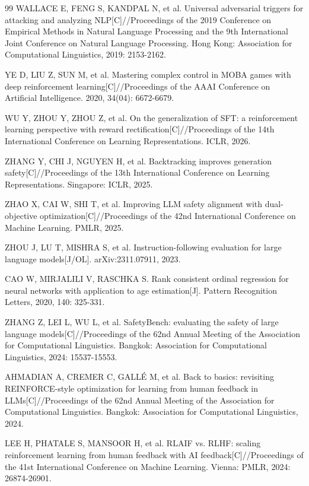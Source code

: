 \documentclass[fontset=fandol,type=master,campus=shenzhen,etitleauto=true]{hithesisbook}
\begin{document}
\begin{thebibliography}{99}
 WALLACE E, FENG S, KANDPAL N, et al. Universal adversarial triggers for attacking and analyzing NLP[C]//Proceedings of the 2019 Conference on Empirical Methods in Natural Language Processing and the 9th International Joint Conference on Natural Language Processing. Hong Kong: Association for Computational Linguistics, 2019: 2153-2162.

 YE D, LIU Z, SUN M, et al. Mastering complex control in MOBA games with deep reinforcement learning[C]//Proceedings of the AAAI Conference on Artificial Intelligence. 2020, 34(04): 6672-6679.

 WU Y, ZHOU Y, ZHOU Z, et al. On the generalization of SFT: a reinforcement learning perspective with reward rectification[C]//Proceedings of the 14th International Conference on Learning Representations. ICLR, 2026.

 ZHANG Y, CHI J, NGUYEN H, et al. Backtracking improves generation safety[C]//Proceedings of the 13th International Conference on Learning Representations. Singapore: ICLR, 2025.

 ZHAO X, CAI W, SHI T, et al. Improving LLM safety alignment with dual-objective optimization[C]//Proceedings of the 42nd International Conference on Machine Learning. PMLR, 2025.

 ZHOU J, LU T, MISHRA S, et al. Instruction-following evaluation for large language models[J/OL]. arXiv:2311.07911, 2023.

 CAO W, MIRJALILI V, RASCHKA S. Rank consistent ordinal regression for neural networks with application to age estimation[J]. Pattern Recognition Letters, 2020, 140: 325-331.

 ZHANG Z, LEI L, WU L, et al. SafetyBench: evaluating the safety of large language models[C]//Proceedings of the 62nd Annual Meeting of the Association for Computational Linguistics. Bangkok: Association for Computational Linguistics, 2024: 15537-15553.

 AHMADIAN A, CREMER C, GALL\'E M, et al. Back to basics: revisiting REINFORCE-style optimization for learning from human feedback in LLMs[C]//Proceedings of the 62nd Annual Meeting of the Association for Computational Linguistics. Bangkok: Association for Computational Linguistics, 2024.

 LEE H, PHATALE S, MANSOOR H, et al. RLAIF vs. RLHF: scaling reinforcement learning from human feedback with AI feedback[C]//Proceedings of the 41st International Conference on Machine Learning. Vienna: PMLR, 2024: 26874-26901.

\end{thebibliography}
\end{document}
